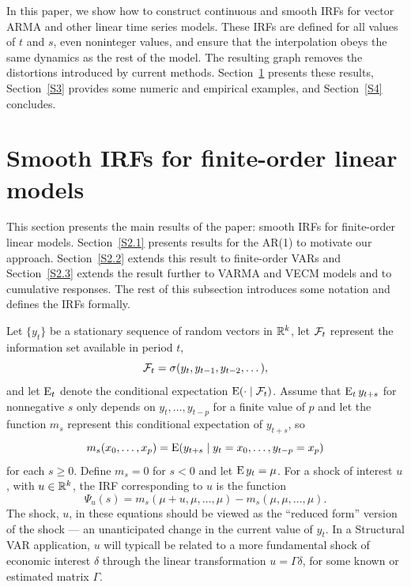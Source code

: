 \documentclass[12pt,fleqn]{article}
\begin{document}
In this paper, we show how to construct continuous and smooth IRFs
for vector ARMA and other linear time series models. These IRFs are
defined for all values of $t$ and $s$, even noninteger values, and
ensure that the interpolation obeys the same dynamics as the rest of
the model. The resulting graph removes the distortions introduced by
current methods.  Section~\ref{S2} presents these results,
Section~\ref{S3} provides some numeric and empirical examples, and
Section~\ref{S4} concludes.

\section{Smooth IRFs for finite-order linear models}
\label{S2}

This section presents the main results of the paper: smooth IRFs for
finite-order linear models. Section~\ref{S2.1} presents results for
the AR(1) to motivate our approach. Section~\ref{S2.2} extends this
result to finite-order VARs and Section~\ref{S2.3} extends the
result further to VARMA and VECM models and to cumulative responses.
The rest of this subsection introduces some notation and defines the
IRFs formally.

Let $\{y_t\}$ be a stationary sequence of random vectors in $\mathbb{R}^k$,
let $\mathcal{F}_t$ represent the information set available in period $t$,
\begin{equation*}
  \mathcal{F}_t = \sigma(y_t, y_{t-1}, y_{t-2},\dots),
\end{equation*}
and let $\operatorname{E}_t$ denote the conditional expectation
$\operatorname{E}(\cdot \mid \mathcal{F}_t)$. Assume that $\operatorname{E}_t y_{t+s}$ for
nonnegative $s$ only depends on $y_t,\dots,y_{t-p}$ for a finite value
of $p$ and let the function $m_s$ represent this conditional
expectation of $y_{t+s}$, so
\begin{equation*}
  m_s(x_0,\dots,x_p)
  = \operatorname{E}(y_{t+s} \mid y_t = x_0,\dots, y_{t-p} = x_p)
\end{equation*}
for each $s \geq 0$. Define $m_s = 0$ for $s < 0$ and let
$\operatorname{E} y_t = \mu$. For a shock of interest $u$, with $u \in \mathbb{R}^k$, the
IRF corresponding to $u$ is the function
\[
  \Psi_u(s) =
  m_s(\mu + u, \mu, \dots, \mu) - m_s(\mu, \mu, \dots,\mu).
\]
The shock, $u$, in these equations should be viewed as the ``reduced
form'' version of the shock --- an unanticipated change in the current
value of $y_t$. In a Structural VAR application, $u$ will typicall
be related to a more fundamental shock of economic interest $\delta$
through the linear transformation $u = \Gamma \delta$, for some known
or estimated matrix $\Gamma$.
\end{document}
